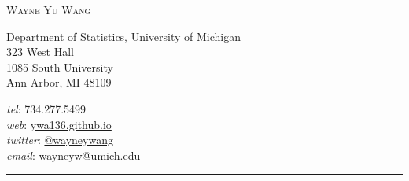 \documentclass[11pt,hidelinks]{article}
\makeatletter
\newcommand{\myname}{Wayne Yu Wang}     %
\newcommand{\websiteurl}{{https://ywa136.github.io}} %
\newcommand{\websitename}{ywa136.github.io}       %
\newcommand{\phone}{734.277.5499}       %
\newcommand{\email}{wayneyw@umich.edu}  %
\newcommand{\twitterurl}{{https://twitter.com/wayneywang}}  %
\newcommand{\twitterhandle}{@wayneywang}      %
\newcommand{\address}{                  %
  Department of Statistics, University of Michigan \\
  323 West Hall \\
  1085 South University \\    
  Ann Arbor, MI 48109                   
}
\makeatother
\begin{document}
\thispagestyle{first}


%

\hspace*{-\parindent}%
\begin{center}
  \vspace{-2em}
  {\LARGE\scshape \myname} \\
\end{center}
\begin{minipage}[t]{.6\linewidth}
\address
\end{minipage}
\hspace*{-\parindent}%
\begin{minipage}[t]{.43\linewidth}
\begin{flushright}
  \textit{tel}: \phone \\
  \textit{web}: \href{\websiteurl}{\websitename} \\
  \textit{twitter}: \href{\twitterurl}{\twitterhandle} \\
  \textit{email}: \href{mailto:\email}{\email}
\end{flushright}
\end{minipage}
\begin{center}
  \vspace{-.5em}
  \rule{\textwidth}{1pt}  
\end{center}



\end{document}

